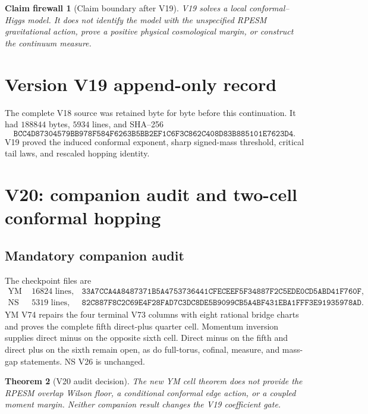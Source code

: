\documentclass[11pt]{article}
\newtheorem{theorem}{Theorem}[section]
\newtheorem{firewall}[theorem]{Claim firewall}
\theoremstyle{remark}
\begin{document}
\begin{firewall}[Claim boundary after V19]
\label{fire:v17v19}
V19 solves a local conformal--Higgs model.  It does not identify the
model with the unspecified RPESM gravitational action, prove a
positive physical cosmological margin, or construct the continuum
measure.
\end{firewall}

\section*{Version V19 append-only record}
The complete V18 source was retained byte for byte before this
continuation.  It had \(188844\) bytes, \(5934\) lines, and SHA--256
\[
 \texttt{BCC4D87304579BB978F584F6263B5BB2EF1C6F3C862C408D83B885101E7623D4}.
\]
V19 proved the induced conformal exponent, sharp signed-mass
threshold, critical tail laws, and rescaled hopping identity.


\section{V20: companion audit and two-cell conformal hopping}
\label{sec:v17v20}

\subsection{Mandatory companion audit}

The checkpoint files are
\[
\begin{array}{lll}
\text{YM V74:}&16824\text{ lines},&
\texttt{33A7CCA4A8487371B5A4753736441CFECEEF5F34887F2C5EDE0CD5ABD41F760F},\\
\text{NS V26:}&5319\text{ lines},&
\texttt{82C887F8C2C69E4F28FAD7C3DC8DE5B9099CB5A4BF431EBA1FFF3E91935978AD}.
\end{array}                                                       \tag{20.1}
\]
YM V74 repairs the four terminal V73 columns with eight rational
bridge charts and proves the complete fifth direct-plus quarter
cell.  Momentum inversion supplies direct minus on the opposite
sixth cell.  Direct minus on the fifth and direct plus on the sixth
remain open, as do full-torus, cofinal, measure, and mass-gap
statements.  NS V26 is unchanged.

\begin{theorem}[V20 audit decision]
\label{thm:v17v20-audit}
The new YM cell theorem does not provide the RPESM overlap Wilson
floor, a conditional conformal edge action, or a coupled moment
margin.  Neither companion result changes the V19 coefficient
gate.
\end{theorem}
\end{document}
